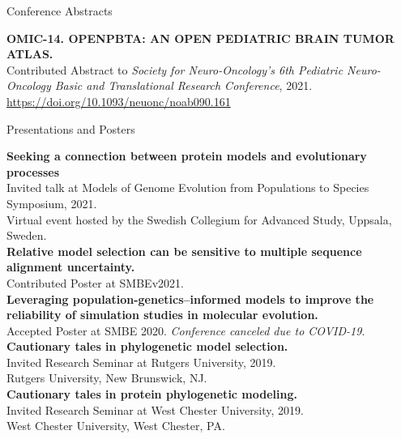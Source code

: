 \documentclass{resume} %
\begin{document}
\vspace*{0.35cm}
\begin{rSection}{Conference Abstracts}
\vspace*{0.25cm}


\textbf{OMIC-14. OPENPBTA: AN OPEN PEDIATRIC BRAIN TUMOR ATLAS.}
\\ Contributed Abstract to \emph{Society for Neuro-Oncology’s 6th Pediatric Neuro-Oncology Basic and Translational Research Conference}, 2021. \url{https://doi.org/10.1093/neuonc/noab090.161}

\end{rSection}



\vspace*{0.5cm}
\begin{rSection}{Presentations and Posters}
\vspace*{0.25cm}


\textbf{Seeking a connection between protein models and evolutionary processes}
\\ Invited talk at Models of Genome Evolution from Populations to Species Symposium, 2021.
\\ Virtual event hosted by the Swedish Collegium for Advanced Study, Uppsala, Sweden. \\


\textbf{Relative model selection can be sensitive to multiple sequence alignment uncertainty.}
\\ Contributed Poster at SMBEv2021. \\


\textbf{Leveraging population-genetics--informed models to improve the reliability of simulation studies in molecular evolution.}
\\ Accepted Poster at SMBE 2020. \emph{Conference canceled due to COVID-19}. \\


\textbf{Cautionary tales in phylogenetic model selection.}
\\ Invited Research Seminar at Rutgers University, 2019.
\\ Rutgers University, New Brunswick, NJ.\\


\textbf{Cautionary tales in protein phylogenetic modeling.}
\\ Invited Research Seminar at West Chester University, 2019.
\\ West Chester University, West Chester, PA.\\



\end{rSection}
\end{document}
